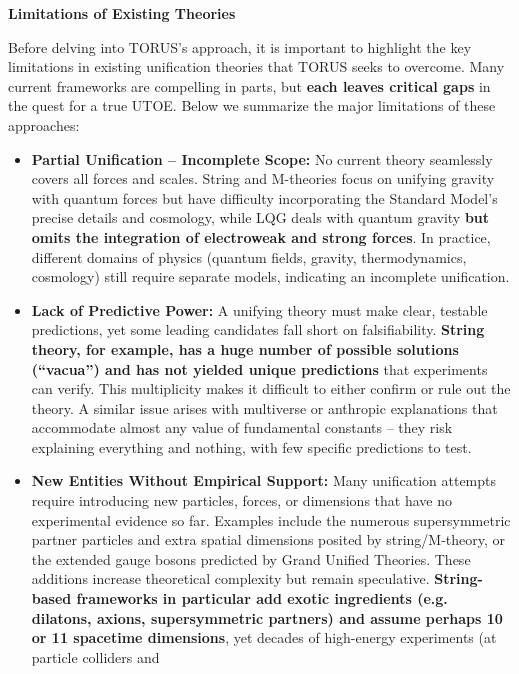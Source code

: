 \documentclass[
]{article}
\begin{document}
\textbf{Limitations of Existing Theories}

Before delving into TORUS's approach, it is important to highlight the
key limitations in existing unification theories that TORUS seeks to
overcome. Many current frameworks are compelling in parts, but
\textbf{each leaves critical gaps} in the quest for a true UTOE. Below
we summarize the major limitations of these approaches:

\begin{itemize}
\item
  \textbf{Partial Unification -- Incomplete Scope:} No current theory
  seamlessly covers all forces and scales. String and M-theories focus
  on unifying gravity with quantum forces but have difficulty
  incorporating the Standard Model's precise details and cosmology,
  while LQG deals with quantum gravity \textbf{but omits the integration
  of electroweak and strong forces}\hspace{0pt}. In practice, different
  domains of physics (quantum fields, gravity, thermodynamics,
  cosmology) still require separate models, indicating an incomplete
  unification.
\item
  \textbf{Lack of Predictive Power:} A unifying theory must make clear,
  testable predictions, yet some leading candidates fall short on
  falsifiability. \textbf{String theory, for example, has a huge number
  of possible solutions (``vacua'') and has not yielded unique
  predictions} that experiments can verify. This multiplicity makes it
  difficult to either confirm or rule out the theory. A similar issue
  arises with multiverse or anthropic explanations that accommodate
  almost any value of fundamental constants -- they risk explaining
  everything and nothing, with few specific predictions to test.
\item
  \textbf{New Entities Without Empirical Support:} Many unification
  attempts require introducing new particles, forces, or dimensions that
  have no experimental evidence so far. Examples include the numerous
  supersymmetric partner particles and extra spatial dimensions posited
  by string/M-theory, or the extended gauge bosons predicted by Grand
  Unified Theories. These additions increase theoretical complexity but
  remain speculative. \textbf{String-based frameworks in particular add
  exotic ingredients (e.g. dilatons, axions, supersymmetric partners)
  and assume perhaps 10 or 11 spacetime dimensions}\hspace{0pt}, yet
  decades of high-energy experiments (at particle colliders and

\end{itemize}
\end{document}
